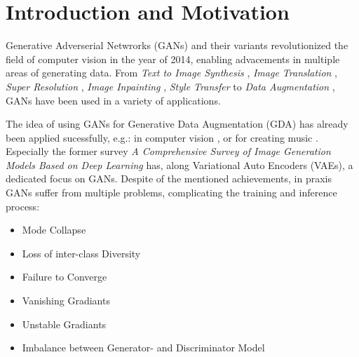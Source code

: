 \section{Introduction and Motivation}\label{introduction_and_motivation}
\pagestyle{fancy}
Generative Adverserial Netwrorks (GANs) \cite{goodfellow2014generativeadversarialnetworks} and their variants revolutionized the field of computer vision in the year of 2014, enabling advacements in multiple areas of generating data. From \textit{Text to Image Synthesis} \cite{reed2016generativeadversarialtextimage}, \textit{Image Translation} \cite{isola2018imagetoimagetranslationconditionaladversarial}, \textit{Super Resolution} \cite{ledig2017photorealisticsingleimagesuperresolution}, \textit{Image Inpainting} \cite{pathak2016contextencodersfeaturelearning}, \textit{Style Transfer} \cite{wang2023multimodalityguidedimagestyletransfer} to \textit{Data Augmentation} \cite{shorten2019survey}, GANs have been used in a variety of applications.

The idea of using GANs for Generative Data Augmentation (GDA) has already been applied sucessfully, e.g.: in computer vision \cite{Li2025comprehensivesurvedeepimages}, \cite{biswas2023generativeadversarialnetworksdata} or for creating music \cite{ji2020comprehensivesurveydeepmusic}. Especially the former survey \textit{A Comprehensive Survey of Image Generation Models Based on Deep Learning} has, along Variational Auto Encoders (VAEs), a dedicated focus on GANs. Despite of the mentioned achievements, in praxis GANs suffer from multiple problems, complicating the training and inference process:

\begin{itemize}\label{problems_of_gans}
    \setlength{\itemsep}{-5pt}
    \item Mode Collapse
    \item Loss of inter-class Diversity
    \item Failure to Converge
    \item Vanishing Gradiants
    \item Unstable Gradiants
    \item Imbalance between Generator- and Discriminator Model
\end{itemize}


